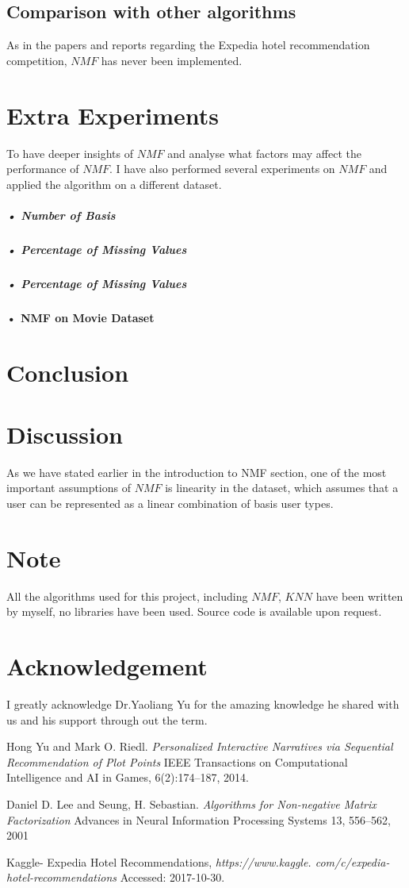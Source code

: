 \documentclass[11pt]{article} %
\begin{document}
\subsection{Comparison with other algorithms}
As in the papers and reports regarding the Expedia hotel recommendation competition, $NMF$ has never been implemented.\section{Extra Experiments}
To have deeper insights of $NMF$ and analyse what factors may affect the performance of $NMF$. I have also performed several experiments on $NMF$ and applied the algorithm on a different dataset. 
\subparagraph{• Number of Basis}
\subparagraph{• Percentage of Missing Values}
\subparagraph{• Percentage of Missing Values}

\paragraph{• NMF on Movie Dataset}
\section{Conclusion}


\section{Discussion}
As we have stated earlier in the introduction to NMF section, one of the most important assumptions of $NMF$ is linearity in the dataset, which assumes that a user can be represented as a linear combination of basis user types.
\section{Note}
All the algorithms used for this project, including $NMF$, $KNN$ have been written by myself, no libraries have been used. Source code is available upon request.
\section{Acknowledgement}
I greatly acknowledge Dr.Yaoliang Yu for the amazing knowledge he shared with us and his support through out the term.


\begin{thebibliography}{9}
Hong Yu and Mark O. Riedl.
\textit{Personalized Interactive Narratives via Sequential
Recommendation of Plot Points}
IEEE Transactions on Computational Intelligence and AI in Games, 6(2):174–187, 2014.

Daniel D. Lee and Seung, H. Sebastian.
\textit{Algorithms for Non-negative Matrix Factorization}
Advances in Neural Information Processing Systems 13, 556--562, 2001

Kaggle- Expedia Hotel Recommendations, 
\textit{https://www.kaggle.
com/c/expedia-hotel-recommendations}
Accessed: 2017-10-30.
\end{thebibliography}
\end{document}
